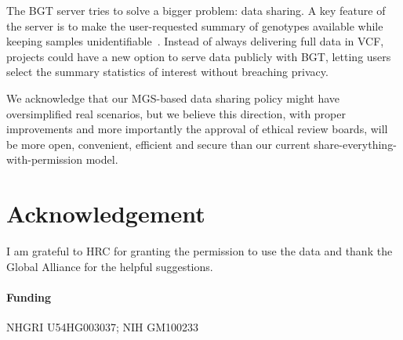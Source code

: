 \documentclass{bioinfo}
\begin{document}
The BGT server tries to solve a bigger problem: data sharing. A key feature of
the server is to make the user-requested summary of genotypes available while
keeping samples unidentifiable~\citep{Stade:2014ty}. Instead of always
delivering full data in VCF, projects could have a new option to serve data
publicly with BGT, letting users select the summary statistics of interest
without breaching privacy.


We acknowledge that our MGS-based data sharing policy might have oversimplified
real scenarios, but we believe this direction, with proper improvements and
more importantly the approval of ethical review boards, will be more open,
convenient, efficient and secure than our current
share-everything-with-permission model.

\section*{Acknowledgement}
I am grateful to HRC for granting the permission to use the data
and thank the Global Alliance for the helpful suggestions.
\paragraph{Funding\textcolon} NHGRI U54HG003037; NIH GM100233


\end{document}
